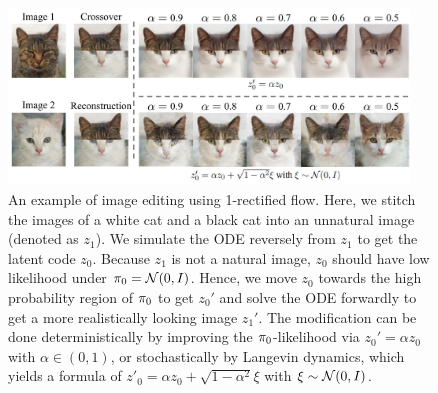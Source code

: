 \begin{figure}
    \centering
    \includegraphics[width=0.95\textwidth]{arxiv_figures/image_editing.jpeg}
    \caption{An example of image editing using 1-rectified flow. 
    Here, we stitch the images of a white cat and a black cat into an unnatural image (denoted as $z_1$).  
    We simulate the  ODE reversely from $z_1$ to get the latent code $z_0$. %
    Because $z_1$ is not a natural image, $z_0$ should have low likelihood under ${\pi}_0 = \mathcal{N}(0,I)$.  
    Hence, we move $z_0$ towards the high probability region of ${\pi}_0$ to get $z_0'$ and solve the ODE forwardly to get a more realistically looking image $z_1'$. 
    The modification can be done deterministically by improving the ${\pi}_0$-likelihood via $z_0' =\alpha z_0$ with $\alpha\in(0,1)$, or 
    stochastically by  Langevin dynamics, 
    which yields a  formula of 
    $z'_0 = \alpha z_0 + \sqrt{1-\alpha^2}\xi$ with $\xi \sim \mathcal{N}(0, I)$. 
    }
    \label{fig:interp_editing}
\end{figure}


